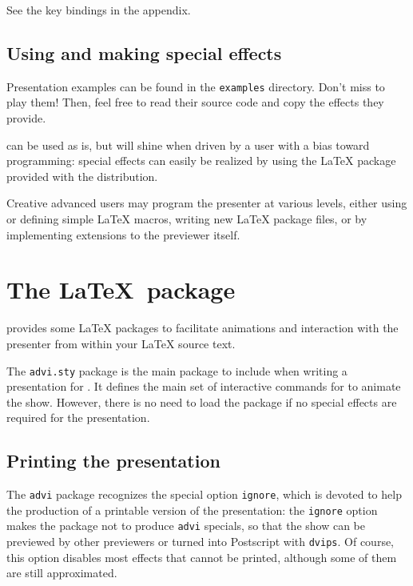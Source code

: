 \documentclass[12pt]{article}
\begin{document}
See the key bindings in the appendix.

\subsection{Using and making special effects}

Presentation examples can be found in the 
\verb"examples" directory. Don't miss to play them! Then, feel free
to read their source code and copy the effects they provide.

{\ActiveDVI} can be used as is, but will shine when driven by a user
with a bias toward programming: special effects can easily 
be realized by using the {\LaTeX} package provided with the distribution. 

Creative advanced users may program the presenter at various levels, either
using or defining simple {\LaTeX} macros, writing new {\LaTeX} package
files, or by implementing extensions to the previewer itself.


\section{The  \LaTeX~package}


{\ActiveDVI} provides some {\LaTeX} packages to facilitate animations and
interaction with the presenter from within your {\LaTeX} source text.

The {\tt advi.sty} package is the main package to include when writing
a presentation for {\ActiveDVI}. It defines the main set of interactive
commands for {\ActiveDVI} to animate the show. However, there is no
need to load the package if no {\ActiveDVI} special effects are
required for the presentation.

\subsection{Printing the presentation}

The {\tt advi} package recognizes the special option \verb"ignore",
which is devoted to help the production of a printable version of the
presentation: the \verb"ignore" option makes the package not to
produce {\tt advi} specials, so that the show can be previewed by
other previewers or turned into Postscript with {\tt dvips}. Of
course, this option disables most effects that cannot be printed,
although some of them are still approximated.
\end{document}
